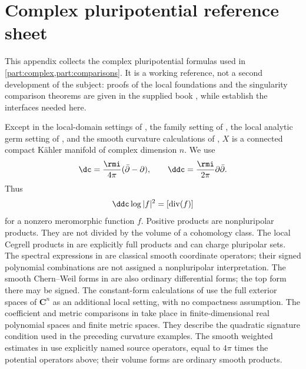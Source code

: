\chapter{Complex pluripotential reference sheet}
\label{app:complex-reference}

This appendix collects the complex pluripotential formulas used in
\cref{part:complex,part:comparisons}. It is a working reference, not a second development of the
subject: proofs of the local foundations and the singularity comparison
theorems are given in the supplied book \cite{XiaBook}, while
 establish the
interfaces needed here.

Except in the local-domain settings of
,
the family setting of ,
the local analytic germ setting of ,
and the smooth curvature calculations of , \(X\) is a connected compact
K\"ahler manifold of complex dimension \(n\). We use
\[
             \dc=\frac{\rmi}{4\pi}(\bar\partial-\partial),
             \qquad
             \ddc=\frac{\rmi}{2\pi}\partial\bar\partial .
\]
Thus
\[
             \ddc\log|f|^2=[\operatorname{div}(f)]
\]
for a nonzero meromorphic function \(f\). Positive products are
nonpluripolar products. They are not divided by the volume of a cohomology
class. The local Cegrell products in
 are explicitly full products and can
charge pluripolar sets.
The spectral expressions in 
are classical smooth coordinate operators; their signed polynomial
combinations are not assigned a nonpluripolar interpretation.
The smooth Chern--Weil forms in 
are also ordinary differential forms; the top form there may be signed.
The constant-form calculations of 
use the full exterior spaces of $\mathbf C^n$ as an additional local
setting, with no compactness assumption.
The coefficient and metric comparisons in
 take place in finite-dimensional
real polynomial spaces and finite metric spaces. They describe the
quadratic signature condition used in the preceding curvature examples.
The smooth weighted estimates in 
use explicitly named source operators, equal to $4\pi$ times the
potential operators above; their volume forms are ordinary smooth products.

